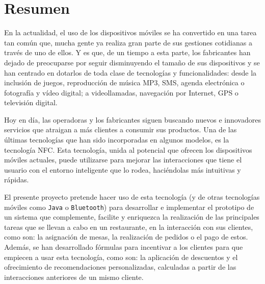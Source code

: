 
\chapter{Resumen}
En la actualidad, el uso de los dispositivos móviles se ha convertido en una
tarea tan común que, mucha gente ya realiza gran parte de sus gestiones 
cotidianas a través de uno de ellos. Y es que, de un tiempo a esta parte, los
fabricantes han dejado de preocuparse por seguir disminuyendo el tamaño de
sus dispositivos y se han centrado en dotarlos de toda clase de tecnologías y 
funcionalidades: desde la inclusión de juegos, reproducción de música MP3,
\acs{SMS}, agenda electrónica o fotografía y vídeo digital; a videollamadas, 
navegación por Internet, \acs{GPS} o televisión digital.

Hoy en día, las operadoras y los fabricantes siguen buscando nuevos e
innovadores servicios que atraigan a más clientes a consumir sus 
productos. Una de las últimas tecnologías que han sido incorporadas en algunos
modelos, es la tecnología \acs{NFC}. Esta tecnología, unida
al potencial que ofrecen los dispositivos móviles actuales, puede utilizarse
para mejorar las interacciones que tiene el usuario con el entorno inteligente
que lo rodea, haciéndolas más intuitivas y rápidas.

El presente proyecto pretende hacer uso de esta tecnología (y de otras
tecnologías móviles como \texttt{Java} o \texttt{Bluetooth}) para desarrollar 
e implementar el prototipo de un sistema que complemente, facilite y enriquezca
la realización de las principales tareas que se llevan a cabo en un
restaurante, en la interacción con sus clientes, como son: la asignación de 
mesas, la realización de pedidos o el pago de estos. Además, se han
desarrollado fórmulas para incentivar a los clientes para que empiecen a 
usar esta tecnología, como son: la aplicación de descuentos y el 
ofrecimiento de recomendaciones personalizadas, calculadas a partir de las 
interacciones anteriores de un mismo cliente.


